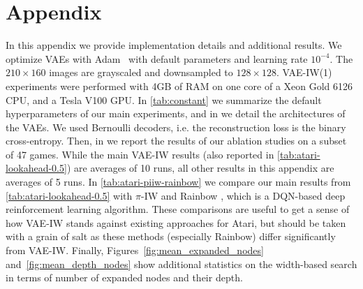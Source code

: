 \section{Appendix}

In this appendix we provide implementation details and additional results. 
We optimize VAEs with Adam~\cite{kingma2014adam} with default parameters and learning rate $10^{-4}$. The $210 \times 160$ images are grayscaled and downsampled to $128 \times 128$. 
VAE-IW(1) experiments were performed with 4GB of RAM on one core of a Xeon Gold 6126 CPU, and a Tesla V100 GPU.
In \cref{tab:constant} we summarize the default hyperparameters of our main experiments, and in
 we detail the architectures of the VAEs. We used Bernoulli decoders, i.e. the reconstruction loss is the binary cross-entropy. 
Then, in  we report the results of our ablation studies on a subset of 47 games. While the main VAE-IW results (also reported in \cref{tab:atari-lookahead-0.5}) are averages of 10 runs, all other results in this appendix are averages of 5 runs. 
In \cref{tab:atari-piiw-rainbow} we compare our main results from \cref{tab:atari-lookahead-0.5} with $\pi$-IW \cite{RLIW} and Rainbow \cite{rainbow}, which is a DQN-based deep reinforcement learning algorithm. These comparisons are useful to get a sense of how VAE-IW stands against existing approaches for Atari, but should be taken with a grain of salt as these methods (especially Rainbow) differ significantly from VAE-IW.
Finally, Figures~\ref{fig:mean_expanded_nodes} and~\ref{fig:mean_depth_nodes} show additional statistics on the width-based search in terms of number of expanded nodes and their depth.

